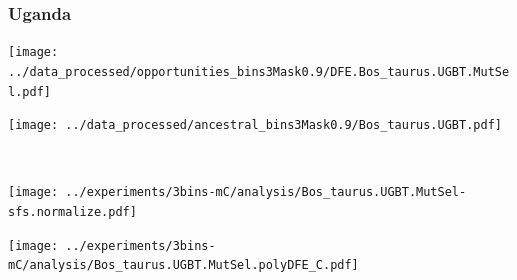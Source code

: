 \subsubsection{Uganda}

\begin{minipage}{0.49\linewidth}
    \texttt{[image: ../data\_processed/opportunities\_bins3Mask0.9/DFE.Bos\_taurus.UGBT.MutSel.pdf]}
\end{minipage}
\begin{minipage}{0.49\linewidth}
    \texttt{[image: ../data\_processed/ancestral\_bins3Mask0.9/Bos\_taurus.UGBT.pdf]}
\end{minipage}
\\
\begin{minipage}{0.49\linewidth}
    \texttt{[image: ../experiments/3bins-mC/analysis/Bos\_taurus.UGBT.MutSel-sfs.normalize.pdf]}
\end{minipage}
\begin{minipage}{0.4\linewidth}
    \texttt{[image: ../experiments/3bins-mC/analysis/Bos\_taurus.UGBT.MutSel.polyDFE\_C.pdf]}
\end{minipage}
